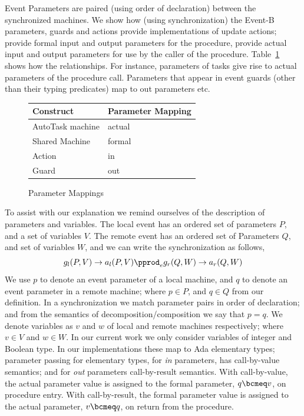Event Parameters are paired (using order of declaration) between the synchronized machines. We show how (using synchronization) the Event-B parameters, guards and actions provide implementations of update actions; provide formal input and output parameters for the procedure, provide actual input and output parameters for use by the caller of the procedure. Table~\ref{tab:paramMap} shows how the relationships. For instance, parameters of tasks give rise to actual parameters of the procedure call. Parameters that appear in event guards (other than their typing predicates) map to out parameters etc.
%
\begin{figure}
\centering
\begin{tabular}{l|l}
Construct & Parameter Mapping\\
\hline
AutoTask machine &actual  \\
\hline
Shared Machine &formal\\
\hline
Action &in\\
\hline
Guard &out 
\end{tabular}
\caption{Parameter Mappings}
\label{tab:paramMap}
\end{figure}

To assist with our explanation we remind ourselves of the description of parameters and variables. The local event has an ordered set of parameters $P$, and a set of variables $V$. The remote event has an ordered set of Parameters $Q$, and set of variables $W$, and we can write the synchronization as follows,
%
\begin{equation}
g_l(P,V)\rightarrow a_l(P,V) \pprod_e g_r(Q,W)\rightarrow a_r(Q,W)
\notag
\end{equation}
%
We use $p$ to denote an event parameter of a local machine, and $q$ to denote an event parameter in a remote machine; where $p\in P$, and $q \in Q$ from our definition. In a synchronization we match parameter pairs in order of declaration; and from the semantics of decomposition/composition we say that $p=q$. We denote variables as $v$ and $w$ of local and remote machines respectively; where $v\in V$ and $w\in W$. In our current work we only consider variables of integer and Boolean type. In our implementations these map to Ada elementary types; parameter passing for elementary types, for \emph{in} parameters, has call-by-value semantics; and for \emph{out} parameters call-by-result semantics. With call-by-value, the actual parameter value is assigned to the formal parameter, $q\bcmeq v$, on procedure entry. With call-by-result, the formal parameter value is assigned to the actual parameter, $v\bcmeq q$, on return from the procedure.

